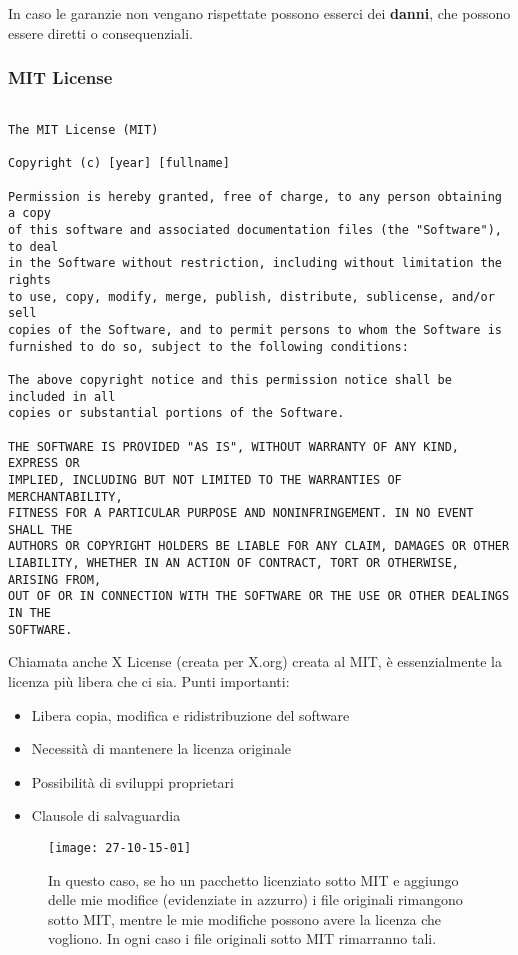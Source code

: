 In caso le garanzie non vengano rispettate possono esserci dei \textbf{danni}, che possono essere diretti o consequenziali.

\newpage

\subsubsection{MIT License}

\begin{verbatim}

The MIT License (MIT)

Copyright (c) [year] [fullname]

Permission is hereby granted, free of charge, to any person obtaining a copy
of this software and associated documentation files (the "Software"), to deal
in the Software without restriction, including without limitation the rights
to use, copy, modify, merge, publish, distribute, sublicense, and/or sell
copies of the Software, and to permit persons to whom the Software is
furnished to do so, subject to the following conditions:

The above copyright notice and this permission notice shall be included in all
copies or substantial portions of the Software.

THE SOFTWARE IS PROVIDED "AS IS", WITHOUT WARRANTY OF ANY KIND, EXPRESS OR
IMPLIED, INCLUDING BUT NOT LIMITED TO THE WARRANTIES OF MERCHANTABILITY,
FITNESS FOR A PARTICULAR PURPOSE AND NONINFRINGEMENT. IN NO EVENT SHALL THE
AUTHORS OR COPYRIGHT HOLDERS BE LIABLE FOR ANY CLAIM, DAMAGES OR OTHER
LIABILITY, WHETHER IN AN ACTION OF CONTRACT, TORT OR OTHERWISE, ARISING FROM,
OUT OF OR IN CONNECTION WITH THE SOFTWARE OR THE USE OR OTHER DEALINGS IN THE
SOFTWARE.

\end{verbatim}

Chiamata anche X License (creata per X.org) creata al MIT, \`e essenzialmente la licenza pi\`u libera che ci sia.
Punti importanti:
\begin{itemize}
\item Libera copia, modifica e ridistribuzione del software
\item Necessit\`a di mantenere la licenza originale
\item Possibilit\`a di sviluppi proprietari
\item Clausole di salvaguardia
\end{itemize}

\begin{figure}[h]
  \centering
  \texttt{[image: 27-10-15-01]}
  \caption{In questo caso, se ho un pacchetto licenziato sotto MIT e aggiungo delle mie modifice (evidenziate in azzurro) i file originali rimangono sotto MIT, mentre le mie modifiche possono avere la licenza che vogliono. In ogni caso i file originali sotto MIT rimarranno tali.}
\end{figure}

